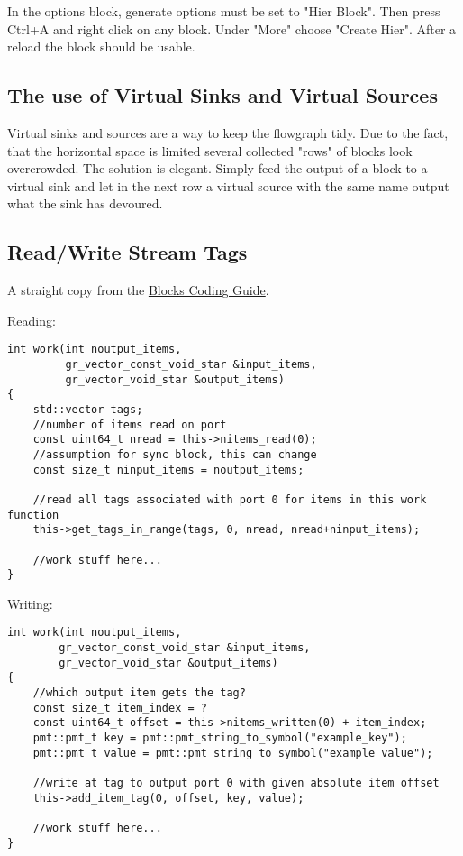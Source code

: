 \documentclass{article}
\begin{document}
In the options block, generate options must be set to "Hier Block". Then press Ctrl+A and right click on any block. Under "More" choose "Create Hier". After a reload the block should be usable.

\subsection{The use of Virtual Sinks and Virtual Sources}

Virtual sinks and sources are a way to keep the flowgraph tidy. Due to the fact, that the horizontal space is limited several collected "rows" of blocks look overcrowded. The solution is elegant. Simply feed the output of a block to a virtual sink and let in the next row a virtual source with the same name output what the sink has devoured.

\subsection{Read/Write Stream Tags}

A straight copy from the \href{https://wiki.gnuradio.org/index.php/BlocksCodingGuide}{Blocks Coding Guide}.

\bigskip

Reading:
\begin{verbatim}
int work(int noutput_items,
         gr_vector_const_void_star &input_items,
         gr_vector_void_star &output_items)
{
	std::vector tags;
	//number of items read on port
	const uint64_t nread = this->nitems_read(0);
	//assumption for sync block, this can change
	const size_t ninput_items = noutput_items; 
	
	//read all tags associated with port 0 for items in this work function
	this->get_tags_in_range(tags, 0, nread, nread+ninput_items);
	
	//work stuff here...
}
\end{verbatim}

\bigskip

Writing:
\begin{verbatim}
int work(int noutput_items,
		gr_vector_const_void_star &input_items,
		gr_vector_void_star &output_items)
{
	//which output item gets the tag?
	const size_t item_index = ? 
	const uint64_t offset = this->nitems_written(0) + item_index;
	pmt::pmt_t key = pmt::pmt_string_to_symbol("example_key");
	pmt::pmt_t value = pmt::pmt_string_to_symbol("example_value");
	
	//write at tag to output port 0 with given absolute item offset
	this->add_item_tag(0, offset, key, value);
	
	//work stuff here...
}
\end{verbatim}
\end{document}
